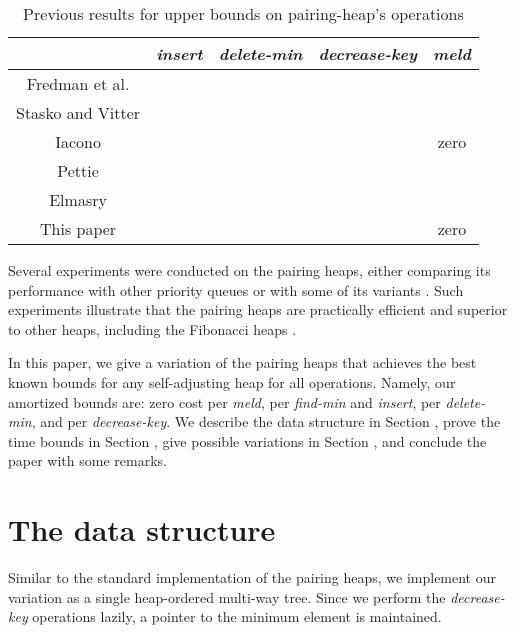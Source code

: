 \begin{table}[tb!]
\label{t1}
\caption{Previous results for upper bounds on pairing-heap's operations}
\begin{small}
\begin{center}
\begin{tabular}{|c|c|c|c|c|}
\hline
 & {\it insert} & {\it delete-min} & {\it decrease-key} & {\it meld} \\
\hline
Fredman et al. \cite{fsst} &  &  &  &  \\
\hline
Stasko and Vitter \cite{sv} &  &  &  &  \\
\hline
Iacono \cite{ia} &   &  &  & zero \\
\hline
Pettie \cite{p} &  &  &  &  \\
\hline
Elmasry \cite{elm0} &  &  &  &  \\
\hline
This paper &  &  &  & zero \\
\hline
\end{tabular}
\end{center}
\end{small}
\end{table}


Several experiments were conducted on the pairing heaps, either comparing its performance with other priority queues \cite{j,ms} or with some of its variants \cite{e,f1,sv}. Such experiments illustrate that the pairing heaps are practically efficient and superior to other heaps, including the Fibonacci heaps \cite{ft}. 

In this paper, we give a variation of the pairing heaps that achieves the best known bounds for any self-adjusting heap for all operations. Namely, our amortized bounds are: zero cost per {\it meld},  per {\it find-min} and {\it insert},  per {\it delete-min}, and  per {\it decrease-key}.
We describe the data structure in Section , prove the time bounds in Section , give possible variations in Section , and conclude the paper with some remarks.
 


\section{The data structure}

Similar to the standard implementation of the pairing heaps, we implement our variation as a single heap-ordered multi-way tree. 
Since we perform the {\it decrease-key} operations lazily, a pointer to the minimum element is maintained.\\
  


